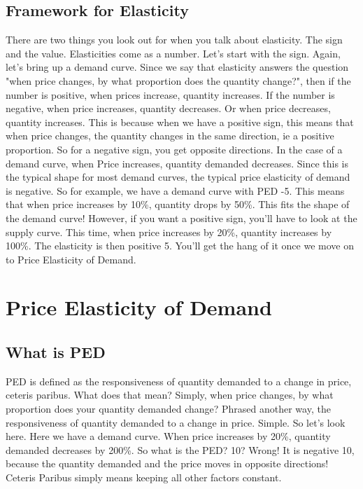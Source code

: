 \subsection{Framework for Elasticity}
There are two things you look out for when you talk about elasticity. The sign and the value. Elasticities come as a number. Let's start with the sign. Again, let's bring up a demand curve. Since we say that elasticity answers the question "when price changes, by what proportion does the quantity change?", then if the number is positive, when prices increase, quantity increases. If the number is negative, when price increases, quantity decreases. Or when price decreases, quantity increases. This is because when we have a positive sign, this means that when price changes, the quantity changes in the same direction, ie a positive proportion. So for a negative sign, you get opposite directions. In the case of a demand curve, when Price increases, quantity demanded decreases. Since this is the typical shape for most demand curves, the typical price elasticity of demand is negative. So for example, we have a demand curve with PED -5. This means that when price increases by 10\%, quantity drops by 50\%. This fits the shape of the demand curve! However, if you want a positive sign, you'll have to look at the supply curve. This time, when price increases by 20\%, quantity increases by 100\%. The elasticity is then positive 5. You'll get the hang of it once we move on to Price Elasticity of Demand.
\newpage
\section{Price Elasticity of Demand}
\subsection{What is PED}
PED is defined as the responsiveness of quantity demanded to a change in price, ceteris paribus. What does that mean? Simply, when price changes, by what proportion does your quantity demanded change? Phrased another way, the responsiveness of quantity demanded to a change in price. Simple. So let's look here. Here we have a demand curve. When price increases by 20\%, quantity demanded decreases by 200\%. So what is the PED? 10? Wrong! It is negative 10, because the quantity demanded and the price moves in opposite directions! Ceteris Paribus simply means keeping all other factors constant. 

